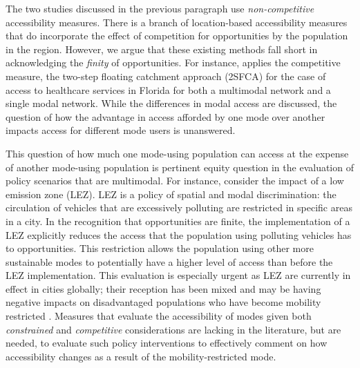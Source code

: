 \documentclass[]{trbunofficial}
\begin{document}
The two studies discussed in the previous paragraph use
\emph{non-competitive} accessibility measures. There is a branch of
location-based accessibility measures that do incorporate the effect of
competition for opportunities by the population in the region. However,
we argue that these existing methods fall short in acknowledging the
\emph{finity} of opportunities. For instance,
\citet{maoMeasuringSpatialAccessibility2013} applies the competitive
measure, the two-step floating catchment approach (2SFCA) for the case
of access to healthcare services in Florida for both a multimodal
network and a single modal network. While the differences in modal
access are discussed, the question of how the advantage in access
afforded by one mode over another impacts access for different mode
users is unanswered.

This question of how much one mode-using population can access at the
expense of another mode-using population is pertinent equity question in
the evaluation of policy scenarios that are multimodal. For instance,
consider the impact of a low emission zone (LEZ). LEZ is a policy of
spatial and modal discrimination: the circulation of vehicles that are
excessively polluting are restricted in specific areas in a city. In the
recognition that opportunities are finite, the implementation of a LEZ
explicitly reduces the access that the population using polluting
vehicles has to opportunities. This restriction allows the population
using other more sustainable modes to potentially have a higher level of
access than before the LEZ implementation. This evaluation is especially
urgent as LEZ are currently in effect in cities globally; their
reception has been mixed \citep{tarrinoortizPublicAcceptabilityLow2021}
and may be having negative impacts on disadvantaged populations who have
become mobility restricted
\citep{devrijNooneVisitsMe2022, verbeekJustManagementUrban2022}.
Measures that evaluate the accessibility of modes given both
\emph{constrained} and \emph{competitive} considerations are lacking in
the literature, but are needed, to evaluate such policy interventions to
effectively comment on how accessibility changes as a result of the
mobility-restricted mode.
\end{document}
